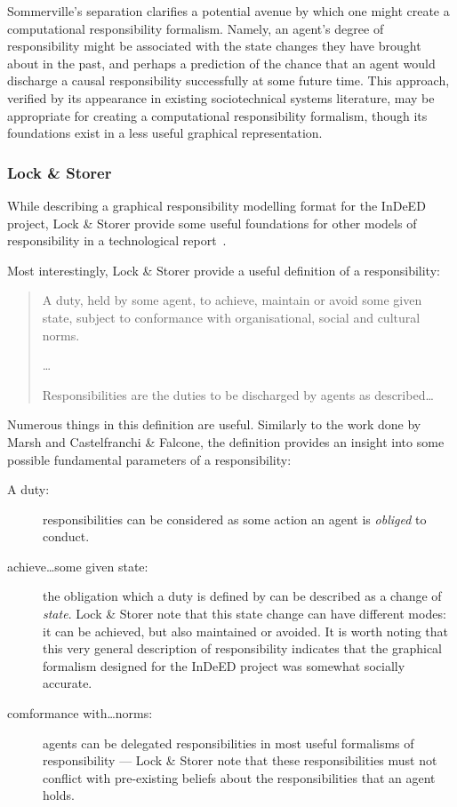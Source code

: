 Sommerville's separation clarifies a potential avenue by which one might create a computational responsibility formalism. Namely, an agent's degree of responsibility might be associated with the state changes they have brought about in the past, and perhaps a prediction of the chance that an agent would discharge a causal responsibility successfully at some future time. This approach, verified by its appearance in existing sociotechnical systems literature, may be appropriate for creating a computational responsibility formalism, though its foundations exist in a less useful graphical representation.\par

\subsubsection{Lock \& Storer~\cite{storer2008modelling}}
While describing a graphical responsibility modelling format for the InDeED project, Lock \& Storer provide some useful foundations for other models of responsibility in a technological report\cite{storer2008modelling}~.\par

Most interestingly, Lock \& Storer provide a useful definition of a responsibility:

\begin{quotation}
    A duty, held by some agent, to achieve, maintain or avoid some given state, subject to conformance with organisational, social and cultural norms.\cite{storer2008modelling}\par
    
    \ldots{}\par
    
    Responsibilities are the duties to be discharged by agents as described\ldots{}
\end{quotation}

Numerous things in this definition are useful. Similarly to the work done by Marsh and Castelfranchi \& Falcone, the definition provides an insight into some possible fundamental parameters of a responsibility:

\begin{description}
    \item [A duty: ] responsibilities can be considered as some action an agent is \emph{obliged} to conduct.
    \item [achieve\ldots{}some given state: ] the obligation which a duty is defined by can be described as a change of \emph{state}. Lock \& Storer note that this state change can have different modes: it can be achieved, but also maintained or avoided. It is worth noting that this very general description of responsibility indicates that the graphical formalism designed for the InDeED project was somewhat socially accurate.
    \item [comformance with\ldots{}norms: ] agents can be delegated responsibilities in most useful formalisms of responsibility --- Lock \& Storer note that these responsibilities must not conflict with pre-existing beliefs about the responsibilities that an agent holds.
\end{description}

